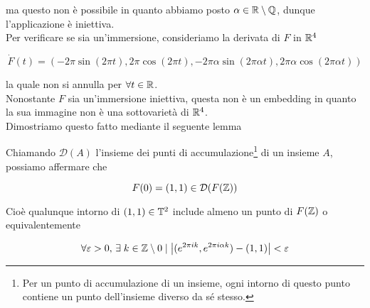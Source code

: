ma questo non è possibile in quanto abbiamo posto $ \alpha \in \mathbb{R} \setminus \mathbb{Q} $, dunque l'applicazione è iniettiva.\\
Per verificare se sia un'immersione, consideriamo la derivata di $ F $ in $ \mathbb{R}^{4} $

\begin{equation}
	\dot{F}(t) = (- 2 \pi \sin(2 \pi t), 2 \pi \cos(2 \pi t), - 2 \pi \alpha \sin(2 \pi \alpha t), 2 \pi \alpha \cos(2 \pi \alpha t))
\end{equation}

la quale non si annulla per $ \forall t \in \mathbb{R} $.\\
Nonostante $ F $ sia un'immersione iniettiva, questa non è un embedding in quanto la sua immagine non è una sottovarietà di $ \mathbb{R}^{4} $.\\
Dimostriamo questo fatto mediante il seguente lemma


\begin{lemma}
	Chiamando $ \mathcal{D}(A) $ l'insieme dei punti di accumulazione\footnote{%
		Per un punto di accumulazione di un insieme, ogni intorno di questo punto contiene un punto dell'insieme diverso da sé stesso.%
	} di un insieme $ A $, possiamo affermare che
	
	\begin{equation}
		F(0) = (1,1) \in \mathcal{D}(F(\mathbb{Z}))
	\end{equation}

	Cioè qualunque intorno di $ (1,1) \in \mathbb{T}^{2} $ include almeno un punto di $ F(\mathbb{Z}) $ o equivalentemente
	
	\begin{equation}
		\forall \varepsilon > 0, \, \exists \; k \in \mathbb{Z} \setminus 0 \mid \left| (e^{2 \pi i k}, e^{2 \pi i \alpha k}) - (1,1) \right| < \varepsilon
	\end{equation}
\end{lemma}

